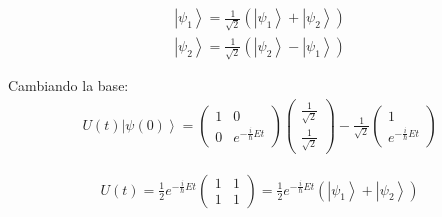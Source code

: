 \begin{equation}\begin{split}
\left |\psi _1 \right\rangle=\frac{1}{\sqrt{2}}\left(\left |\psi _1 \right\rangle+\left |\psi _2 \right\rangle\right)\\
\left |\psi _2 \right\rangle=\frac{1}{\sqrt{2}}\left(\left |\psi _2 \right\rangle-\left |\psi _1 \right\rangle\right)
\end{split}\end{equation}

Cambiando la base:
\begin{equation}\begin{split}
U\left(t\right)\left |\psi \left(0\right) \right\rangle=\left(\begin{matrix}1&0\\0&e^{-\frac{i}{\hbar }Et}\end{matrix}\right)\left(\begin{matrix}\frac{1}{\sqrt{2}}\\\frac{1}{\sqrt{2}}\end{matrix}\right)-\frac{1}{\sqrt{2}}\left(\begin{matrix}1\\e^{-\frac{i}{\hbar }Et}\end{matrix}\right)
\end{split}\end{equation}

\begin{equation}\begin{split}
U\left(t\right)=\frac{1}{2}e^{-\frac{i}{\hbar }Et}\left(\begin{matrix}1&1\\1&1\end{matrix}\right)=\frac{1}{2}e^{-\frac{i}{\hbar }Et}\left(\left |\psi _1 \right\rangle+\left |\psi _2 \right\rangle\right)
\end{split}\end{equation}

